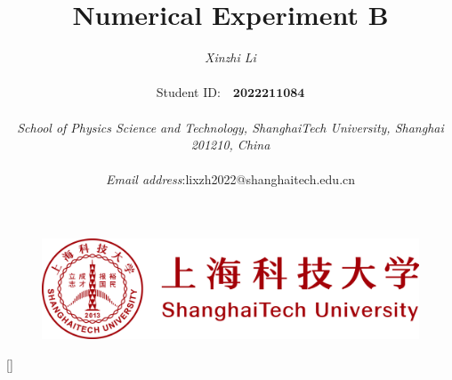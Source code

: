 \documentclass[a4paper,11pt]{article}
\begin{document}
\pagestyle{fancy}
\title{\textbf{\Huge{Numerical Experiment B}}}

\author{\textit{Xinzhi Li} \\\quad\\Student ID:~~$\boldsymbol{2022211084}$\\\quad\\ \textit{School of Physics Science and Technology, ShanghaiTech University, Shanghai 201210, China}\\\quad \\ \textit{Email address}:\quad lixzh2022@shanghaitech.edu.cn}



\begin{figure}[t]
\centering
\includegraphics[width=1\columnwidth]{logo/row.png}
\end{figure}

\maketitle\thispagestyle{empty}

[]
\titlespacing{\section}{2pt}{16pt}{10pt}
\titlespacing{\subsection}{2pt}{8pt}{4pt}
\newpage
\setcounter{page}{1}
\end{document}
